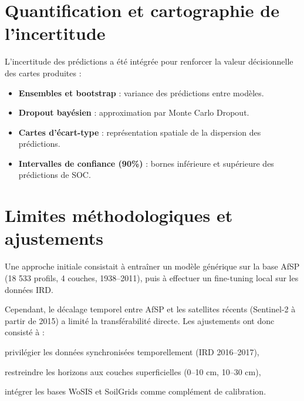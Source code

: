 \documentclass[12pt,a4paper,oneside]{report}
\begin{document}

\section{Quantification et cartographie de l’incertitude}
L’incertitude des prédictions a été intégrée pour renforcer la valeur décisionnelle des cartes produites :
\begin{itemize}
\item \textbf{Ensembles et bootstrap} : variance des prédictions entre modèles.
\item \textbf{Dropout bayésien} : approximation par Monte Carlo Dropout.
\item \textbf{Cartes d’écart-type} : représentation spatiale de la dispersion des prédictions.
\item \textbf{Intervalles de confiance (90\%)} : bornes inférieure et supérieure des prédictions de SOC.
\end{itemize}

\section{Limites méthodologiques et ajustements}

Une approche initiale consistait à entraîner un modèle générique sur la base AfSP (18 533 profils, 4 couches, 1938–2011), puis à effectuer un fine-tuning local sur les données IRD.

Cependant, le décalage temporel entre AfSP et les satellites récents (Sentinel-2 à partir de 2015) a limité la transférabilité directe. Les ajustements ont donc consisté à :

privilégier les données synchronisées temporellement (IRD 2016–2017),

restreindre les horizons aux couches superficielles (0–10 cm, 10–30 cm),

intégrer les bases WoSIS et SoilGrids comme complément de calibration.
\end{document}
